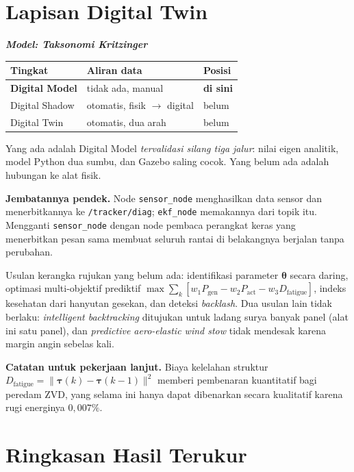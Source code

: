 \documentclass[11pt,a4paper]{article}
\newcommand{\model}[1]{\textbf{\textit{Model: #1}}}
\begin{document}
\section{Lapisan Digital Twin}

\model{Taksonomi Kritzinger}

\begin{longtable}{l l l}
\toprule
\textbf{Tingkat} & \textbf{Aliran data} & \textbf{Posisi} \\
\midrule
\textbf{Digital Model} & tidak ada, manual & \textbf{di sini} \\
Digital Shadow & otomatis, fisik $\rightarrow$ digital & belum \\
Digital Twin & otomatis, dua arah & belum \\
\bottomrule
\end{longtable}

Yang ada adalah Digital Model \emph{tervalidasi silang tiga jalur}: nilai eigen analitik, model Python dua
sumbu, dan Gazebo saling cocok. Yang belum ada adalah hubungan ke alat fisik.

\textbf{Jembatannya pendek.} Node \texttt{sensor\_node} menghasilkan data sensor dan menerbitkannya ke
\texttt{/tracker/diag}; \texttt{ekf\_node} memakannya dari topik itu. Mengganti \texttt{sensor\_node} dengan
node pembaca perangkat keras yang menerbitkan pesan sama membuat seluruh rantai di belakangnya berjalan
tanpa perubahan.

Usulan kerangka rujukan yang belum ada: identifikasi parameter $\bm{\theta}$ secara daring, optimasi
multi-objektif prediktif
$\max \sum_k [w_1 P_{\mathrm{gen}} - w_2 P_{\mathrm{act}} - w_3 D_{\mathrm{fatigue}}]$,
indeks kesehatan dari hanyutan gesekan, dan deteksi \emph{backlash}. Dua usulan lain tidak berlaku:
\emph{intelligent backtracking} ditujukan untuk ladang surya banyak panel (alat ini satu panel), dan
\emph{predictive aero-elastic wind stow} tidak mendesak karena margin angin sebelas kali.

\textbf{Catatan untuk pekerjaan lanjut.} Biaya kelelahan struktur
$D_{\mathrm{fatigue}} = \lVert \bm{\tau}(k) - \bm{\tau}(k-1) \rVert^2$ memberi pembenaran kuantitatif bagi
peredam ZVD, yang selama ini hanya dapat dibenarkan secara kualitatif karena rugi energinya $0{,}007\%$.

\section{Ringkasan Hasil Terukur}
\end{document}

